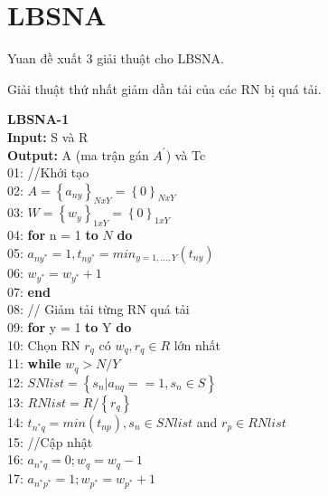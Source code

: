 \documentclass[hidelinks, 11pt, a4paper]{report}
\newenvironment{codeb}{\code}{\par}
\begin{document}
\section{LBSNA}
Yuan đề xuất 3 giải thuật cho LBSNA.

Giải thuật thứ nhất giảm dần tải của các RN bị quá tải. 

\textbf{LBSNA-1}\\
\begin{codeb}
    \textbf{Input:} S và R\\
    \textbf{Output:} A (ma trận gán $A^{'}$) và Tc\\
    01: //Khởi tạo\\
    02: $A = \left\{a_{ny}\right\}_{NxY} = \left\{0\right\}_{NxY}$\\
    03: $W = \left\{w_{y}\right\}_{1xY} = \left\{0\right\}_{1xY}$\\
    04: \textbf{for} n = 1 \textbf{to} $N$ \textbf{do}\\
    05: \hspace{2mm}$a_{ny^*} = 1, t_{ny^*} = min_{y=1,...,Y}(t_{ny})$\\
    06: \hspace{2mm}$w_{y^*} = w_{y^*} + 1$\\
    07: \textbf{end}\\
    08: // Giảm tải từng RN quá tải\\
    09: \textbf{for} y = 1 \textbf{to} Y \textbf{do}\\
    10: \hspace{2mm}Chọn RN $r_q$ có $w_q, r_q \in R$ lớn nhất\\
    11: \hspace{2mm}\textbf{while} $w_q > N/Y$\\
    12: \hspace{4mm}$SNlist = \left\{s_n | a_{nq} == 1, s_n \in S\right\}$\\
    13: \hspace{4mm}$RNlist = R/\left\{r_q\right\}$\\
    14: \hspace{4mm}$t_{n^*q} = min(t_{np}), s_n \in SNlist$ and $r_p \in RNlist$\\
    15: \hspace{4mm}//Cập nhật\\
    16: \hspace{4mm}$a_{n^*q} = 0; w_q = w_q - 1$\\
    17: \hspace{4mm}$a_{n^*p^*} = 1; w_{p^*} = w_{p^*} + 1$\\

\end{codeb}
\end{document}
